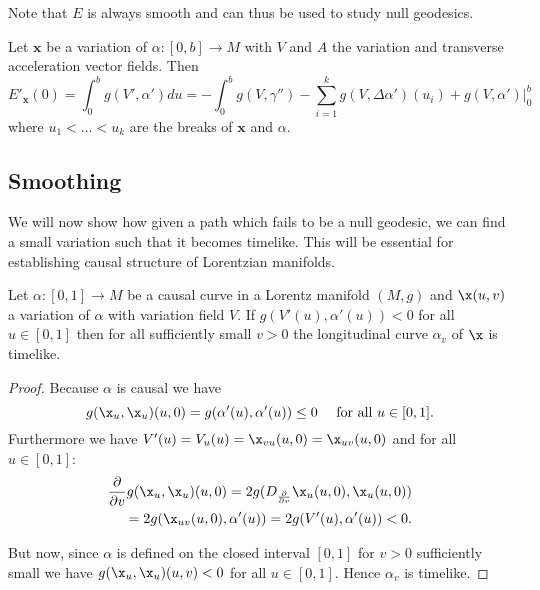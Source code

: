 Note that $E$ is always smooth and can thus be used to study null geodesics.

\begin{proposition}\label{prop:Evariation}
Let $\mathbf{x}$ be a variation of $\alpha:[0,b]\to M$ with $V$ and $A$ the variation and transverse acceleration vector fields. Then
\[
    E'_{\mathbf{x}}(0) = \int_0^b g(V',\alpha')du = - \int_0^b g(V,\gamma'') - \sum_{i=1}^k g(V,\Delta\alpha')(u_i) + \left.g(V,\alpha')\right\rvert^b_0
\]
where $u_1<\dots<u_k$ are the breaks of $\mathbf{x}$ and $\alpha$.
\end{proposition}

\subsection{Smoothing}
We will now show how given a path which fails to be a null geodesic, we can find a small variation such that it becomes timelike. This will be essential for establishing causal structure of Lorentzian manifolds.

\begin{lemma}
Let $\alpha:[0,1]\to M$ be a causal curve in a Lorentz manifold $(M,g)$ and $\x(u,v)$ a variation of $\alpha$ with variation field $V$. If $g(V'(u),\alpha'(u))<0$ for all $u\in [0,1]$ then for all sufficiently small $v>0$ the longitudinal curve $\alpha_v$ of $\x$ is timelike.
\end{lemma}
\begin{proof}
Because $\alpha$ is causal we have 
\[
    g(\x_u,\x_u)(u,0) = g(\alpha'(u),\alpha'(u)) \leq 0 \quad \text{ for all }u\in[0,1].
\]
Furthermore we have $V'(u) = V_u(u) = \x_{vu}(u,0) = \x_{uv}(u,0)$ and for all $u\in [0,1]$:
\begin{align*}
    \frac{\partial}{\partial v}g(\x_u,\x_u)(u,0) = 2g(D_{\frac{\partial}{\partial v}}\x_u(u,0),\x_u(u,0))\\
    = 2g(\x_{uv}(u,0), \alpha'(u)) = 2g(V'(u),\alpha'(u)) < 0.
\end{align*}

But now, since $\alpha$ is defined on the closed interval $[0,1]$ for $v>0$ sufficiently small we have $g(\x_u,\x_u)(u,v)<0$ for all $u\in [0,1]$. Hence $\alpha_v$ is timelike.
\end{proof}

